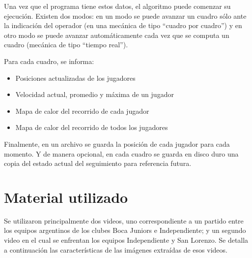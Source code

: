 Una vez que el programa tiene estos datos, el algoritmo puede comenzar su
ejecución. Existen dos modos: en un modo se puede avanzar un cuadro sólo ante la
indicación del operador (en una mecánica de tipo ``cuadro por cuadro'') y en
otro modo se puede avanzar automáticamente cada vez que se computa un cuadro
(mecánica de tipo ``tiempo real'').

Para cada cuadro, se informa:
\begin{itemize}
\item Posiciones actualizadas de los jugadores
\item Velocidad actual, promedio y máxima de un jugador
\item Mapa de calor del recorrido de cada jugador
\item Mapa de calor del recorrido de todos los jugadores
\end{itemize}

Finalmente, en un archivo se guarda la posición de cada jugador para cada momento.
Y de manera opcional, en cada cuadro se guarda en disco duro una copia del estado
actual del seguimiento para referencia futura.

\section{Material utilizado}

Se utilizaron principalmente dos videos, uno correspondiente a un partido entre
los equipos argentinos de los clubes Boca Juniors e Independiente; y un segundo
video en el cual se enfrentan los equipos Independiente y San Lorenzo. Se
detalla a continuación las características de las imágenes extraídas de esos
videos.

